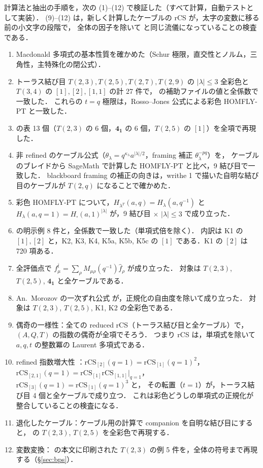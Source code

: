 \documentclass[11pt,a4paper]{ltjsarticle}
\theoremstyle{definition}
\theoremstyle{remark}
\newcommand{\hf}{\widehat{f}}
\begin{document}
計算法と抽出の手順を，次の (1)--(12) で検証した（すべて計算，自動テストとして実装）．
(9)--(12) は，新しく計算したケーブルの rCS が，太字の変数に移る前の小文字の段階で，
全体の因子を除いて \cite{KN} と同じ流儀になっていることの検査である．
\begin{enumerate}
\item Macdonald 多項式の基本性質を確かめた（Schur 極限，直交性とノルム，三角性，主特殊化の閉公式）．
\item トーラス結び目 $T(2,3),T(2,5),T(2,7),T(2,9)$ の $|\lambda|\le3$ 全彩色と $T(3,4)$ の $[1],[2],[1,1]$ の計 27 件で，
  \cite{KN} の補助ファイルの値と全係数で一致した．
  これらの $t=q$ 極限は，Rosso--Jones 公式による彩色 HOMFLY-PT と一致した．
\item \cite[付録 C]{KN} の表 13 個（$T(2,3)$ の 6 個，$\mathbf{4_1}$ の 6 個，$T(2,5)$ の $[1]$）を全項で再現した．
\item 非 refined のケーブル公式（$\theta_\lambda=q^{\kappa_\lambda}a^{|\lambda|/2}$，framing 補正 $\theta_\lambda^{-pq}$）を，
  ケーブルのブレイドから SageMath で計算した HOMFLY-PT と比べ，9 結び目で一致した．
  blackboard framing の補正の向きは，writhe 1 で描いた自明な結び目のケーブルが $T(2,q)$ になることで確かめた．
\item 彩色 HOMFLY-PT について，$H_{\lambda^T}(a,q)=H_\lambda(a,q^{-1})$ と
  $H_\lambda(a,q{=}1)=H_\square(a,1)^{|\lambda|}$ が，9 結び目 $\times$ $|\lambda|\le3$ で成り立った．
\item \cite{CD14} の明示例 8 件と，全係数で一致した（単項式倍を除く）．
  内訳は K1 の $[1],[2]$ と，K2, K3, K4, K5a, K5b, K5c の $[1]$ である．K1 の $[2]$ は 720 項ある．
\item 全評価点で $f^{\bar t}_\mu=\sum_\rho M_{\mu\rho}(q^{-1})\hf_\rho$ が成り立った．
  対象は $T(2,3)$, $T(2,5)$, $\mathbf{4_1}$ と全ケーブルである．
\item An.~Morozov の一次ずれ公式 \cite{AnMo} が，正規化の自由度を除いて成り立った．
  対象は $T(2,3)$, $T(2,5)$, K1, K2 の全彩色である．
\item 偶奇の一様性：全ての reduced rCS（トーラス結び目と全ケーブル）で，$(A,Q,T)$ の指数の偶奇が全項でそろう．
  つまり rCS は，単項式を除いて $a,q,t$ の整数冪の Laurent 多項式である．
\item refined 指数増大性 \cite[\S2]{KN}：$\mathrm{rCS}_{[2]}(q{=}1)=\mathrm{rCS}_{[1]}(q{=}1)^2$，
  $\mathrm{rCS}_{[2,1]}(q{=}1)=\mathrm{rCS}_{[1]}\mathrm{rCS}_{[1,1]}|_{q=1}$，$\mathrm{rCS}_{[3]}(q{=}1)=\mathrm{rCS}_{[1]}(q{=}1)^3$ と，
  その転置（$t=1$）が，トーラス結び目 4 個と全ケーブルで成り立つ．
  これは彩色どうしの単項式の正規化が整合していることの検査になる．
\item 退化したケーブル：ケーブル用の計算で companion を自明な結び目にすると，\cite{KN} の $T(2,3)$, $T(2,5)$ を全彩色で再現する．
\item 変数変換：\cite{KN} の本文に印刷された $T(2,3)$ の例 5 件を，全体の符号まで再現する（\S\ref{sec:bps}）．
\end{enumerate}
\end{document}
